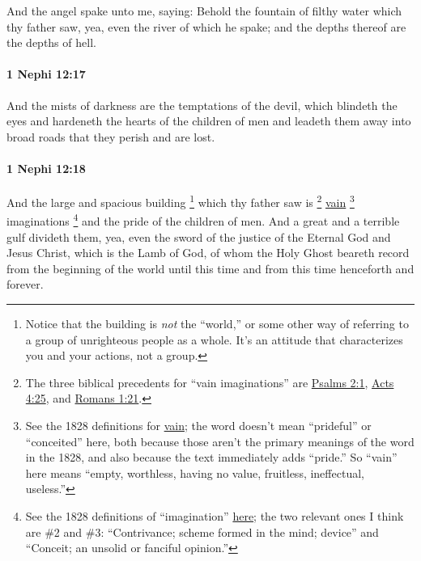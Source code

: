 			And the angel spake unto me, saying:
			Behold the fountain of filthy water which thy father saw,
			yea, even the river of which he spake;
			and the depths thereof are the depths of hell.

		\paragraph{1 Nephi 12:17} %
			\label{1NEPHI-12-17}

			And the mists of darkness are the temptations of the devil,
			which blindeth the eyes and hardeneth the hearts of the children of men
			and leadeth them away into broad roads
			that they perish and are lost.

		\paragraph{1 Nephi 12:18} %
			\label{1NEPHI-12-18}

			And the large and spacious building%
			\footnote{%
				Notice that the building is \textit{not} the ``world,'' or some other way of referring to a group of unrighteous people as a whole. It's an attitude that characterizes you and your actions, not a group.
				}
			which thy father saw
			is
				\footnote{%
					The three biblical precedents for ``vain imaginations'' are \hyperref[PSALMS-2-1]{Psalms 2:1}, \hyperref[ACTS-4-25]{Acts 4:25}, and \hyperref[ROMANS-1-21]{Romans 1:21}.
					}%
			\hyperref[VANITY-1828]{vain}%
				\footnote{%
					See the 1828 definitions for \hyperref[VANITY-1828]{vain}; the word doesn't mean ``prideful'' or ``conceited'' here, both because those aren't the primary meanings of the word in the 1828, and also because the text immediately adds ``pride.'' So ``vain'' here means ``empty, worthless, having no value, fruitless, ineffectual, useless.''
					}
			imaginations%
				\footnote{%
					\label{1NEPHI-12-18-NOTE-imagination}%
					See the 1828 definitions of ``imagination'' \hyperref[IMAGINATION-1828]{here}; the two relevant ones I think are \#2 and \#3: ``Contrivance; scheme formed in the mind; device'' and ``Conceit; an unsolid or fanciful opinion.''
					} 
			and the pride of the children of men.
			And a great and a terrible gulf divideth them,
			yea, even the sword of the justice of the Eternal God and Jesus Christ,
			which is the Lamb of God,
			of whom the Holy Ghost beareth record
			from the beginning of the world until this time
			and from this time henceforth and forever.

